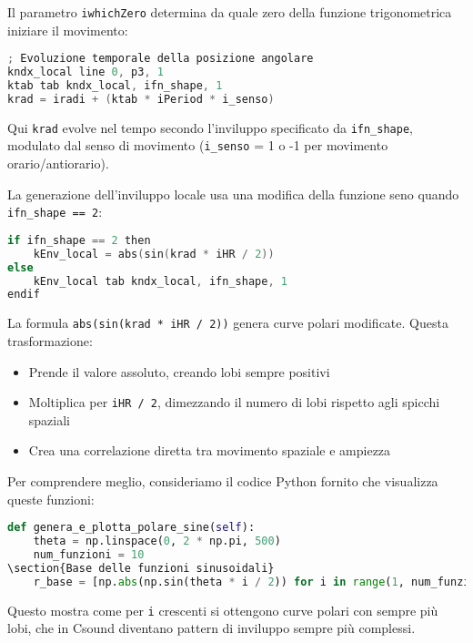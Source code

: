 Il parametro \texttt{iwhichZero} determina da quale zero della funzione trigonometrica iniziare il movimento:

\begin{lstlisting}[language=C]
; Evoluzione temporale della posizione angolare
kndx_local line 0, p3, 1
ktab tab kndx_local, ifn_shape, 1
krad = iradi + (ktab * iPeriod * i_senso)
\end{lstlisting}

Qui \texttt{krad} evolve nel tempo secondo l'inviluppo specificato da \texttt{ifn\_shape}, modulato dal senso di movimento (\texttt{i\_senso} = 1 o -1 per movimento orario/antiorario).

La generazione dell'inviluppo locale usa una modifica della funzione seno quando \texttt{ifn\_shape == 2}:

\begin{lstlisting}[language=C]
if ifn_shape == 2 then
    kEnv_local = abs(sin(krad * iHR / 2))
else
    kEnv_local tab kndx_local, ifn_shape, 1
endif
\end{lstlisting}

La formula \texttt{abs(sin(krad * iHR / 2))} genera curve polari modificate. Questa trasformazione:
\begin{itemize}
    \item Prende il valore assoluto, creando lobi sempre positivi
    \item Moltiplica per \texttt{iHR / 2}, dimezzando il numero di lobi rispetto agli spicchi spaziali
    \item Crea una correlazione diretta tra movimento spaziale e ampiezza
\end{itemize}

Per comprendere meglio, consideriamo il codice Python fornito che visualizza queste funzioni:

\begin{lstlisting}[language=Python]
def genera_e_plotta_polare_sine(self):
    theta = np.linspace(0, 2 * np.pi, 500)
    num_funzioni = 10
\section{Base delle funzioni sinusoidali}
    r_base = [np.abs(np.sin(theta * i / 2)) for i in range(1, num_funzioni + 1)]
\end{lstlisting}

Questo mostra come per \texttt{i} crescenti si ottengono curve polari con sempre più lobi, che in Csound diventano pattern di inviluppo sempre più complessi.

